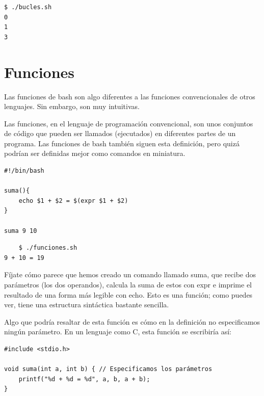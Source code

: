 \begin{tcolorbox-code}
\begin{lstlisting}
$ ./bucles.sh
0
1
3
\end{lstlisting}
\end{tcolorbox-code}

\section{Funciones}
Las funciones de bash son algo diferentes a las funciones convencionales de otros lenguajes. Sin embargo, son muy intuitivas.

Las funciones, en el lenguaje de programación convencional, son unos conjuntos de código que pueden ser llamados (ejecutados) en diferentes partes de un programa. Las funciones de bash también siguen esta definición, pero quizá podrían ser definidas mejor como comandos en miniatura.

\begin{tcolorbox-code}
\begin{lstlisting}
#!/bin/bash

suma(){
	echo $1 + $2 = $(expr $1 + $2)
}

suma 9 10
\end{lstlisting}
\end{tcolorbox-code}

\begin{tcolorbox-code}
\begin{lstlisting}
    $ ./funciones.sh
9 + 10 = 19
\end{lstlisting}
\end{tcolorbox-code}

Fíjate cómo parece que hemos creado un comando llamado suma, que recibe dos parámetros (los dos operandos), calcula la suma de estos con expr e imprime el resultado de una forma más legible con echo. Esto es una función; como puedes ver, tiene una estructura sintáctica bastante sencilla.

Algo que podría resaltar de esta función es cómo en la definición no especificamos ningún parámetro. En un lenguaje como C, esta función se escribiría así:

\begin{tcolorbox-code}
\begin{lstlisting}
#include <stdio.h>

void suma(int a, int b) { // Especificamos los parámetros
	printf("%d + %d = %d", a, b, a + b);
}
\end{lstlisting}
\end{tcolorbox-code}


